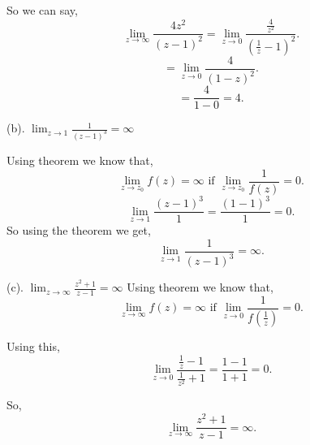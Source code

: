 \documentclass[a4paper]{report}
\begin{document}
So we can say, \[
    \lim_{z \to \infty} \frac{4z^2}{(z-1)^2} = \lim_{z \to 0} \frac{\frac{4}{z^2}}{(\frac{1}{z} - 1)^2}
.\]
\[
    = \lim_{z \to 0} \frac{4}{(1 - z)^2}
.\] 
\[
    = \frac{4}{1-0} = 4
.\] 

(b). $\lim_{z \to 1} \frac{1}{(z-1)^3} = \infty$

Using theorem we know that, \[
    \lim_{z \to z_0} f(z) = \infty \text{ if } \lim_{z \to z_0} \frac{1}{f(z)} = 0
.\] 
\[
    \lim_{z \to 1} \frac{(z-1)^3}{1} = \frac{(1-1)^3}{1} = 0
.\] 
So using the theorem we get, \[
 \lim_{z \to 1} \frac{1}{(z-1)^3} = \infty
.\] 

(c). $\lim_{z \to \infty} \frac{z^2 + 1}{z-1} = \infty$
Using theorem we know that, \[
    \lim_{z \to \infty} f(z) = \infty \text{ if } \lim_{z \to 0} \frac{1}{f(\frac{1}{z})} = 0
.\] 

Using this, \[
    \lim_{z \to 0} \frac{\frac{1}{z} - 1}{\frac{1}{z^2} + 1} = \frac{1 - 1}{1 + 1} = 0
.\]         

So, \[
 \lim_{z \to \infty} \frac{z^2 + 1}{z-1} = \infty
.\] 
\end{document}
